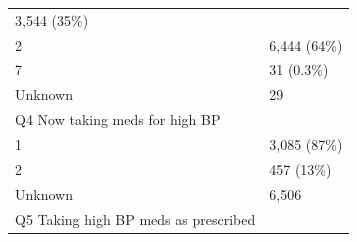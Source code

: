 \documentclass[]{article}
\begin{document}
\begin{longtable}[]{@{}ll@{}}
\begin{minipage}[t]{0.23\columnwidth}
3,544 (35\%)\strut
\end{minipage}\tabularnewline
\begin{minipage}[t]{0.71\columnwidth}\raggedright
2\strut
\end{minipage} & \begin{minipage}[t]{0.23\columnwidth}\raggedright
6,444 (64\%)\strut
\end{minipage}\tabularnewline
\begin{minipage}[t]{0.71\columnwidth}\raggedright
7\strut
\end{minipage} & \begin{minipage}[t]{0.23\columnwidth}\raggedright
31 (0.3\%)\strut
\end{minipage}\tabularnewline
\begin{minipage}[t]{0.71\columnwidth}\raggedright
Unknown\strut
\end{minipage} & \begin{minipage}[t]{0.23\columnwidth}\raggedright
29\strut
\end{minipage}\tabularnewline
\begin{minipage}[t]{0.71\columnwidth}\raggedright
Q4 Now taking meds for high BP\strut
\end{minipage} & \begin{minipage}[t]{0.23\columnwidth}\raggedright
\strut
\end{minipage}\tabularnewline
\begin{minipage}[t]{0.71\columnwidth}\raggedright
1\strut
\end{minipage} & \begin{minipage}[t]{0.23\columnwidth}\raggedright
3,085 (87\%)\strut
\end{minipage}\tabularnewline
\begin{minipage}[t]{0.71\columnwidth}\raggedright
2\strut
\end{minipage} & \begin{minipage}[t]{0.23\columnwidth}\raggedright
457 (13\%)\strut
\end{minipage}\tabularnewline
\begin{minipage}[t]{0.71\columnwidth}\raggedright
Unknown\strut
\end{minipage} & \begin{minipage}[t]{0.23\columnwidth}\raggedright
6,506\strut
\end{minipage}\tabularnewline
\begin{minipage}[t]{0.71\columnwidth}\raggedright
Q5 Taking high BP meds as prescribed\strut
\end{minipage} & \begin{minipage}[t]{0.23\columnwidth}\raggedright

\end{minipage}
\end{longtable}
\end{document}
